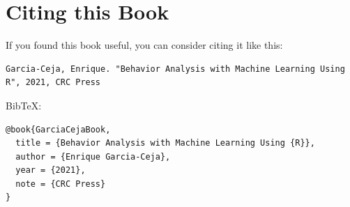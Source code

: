 \documentclass[
  11pt,
]{krantz}
\begin{document}
\hypertarget{citing-this-book}{%
\chapter*{Citing this Book}\label{citing-this-book}}


If you found this book useful, you can consider citing it like this:

\begin{verbatim}
Garcia-Ceja, Enrique. "Behavior Analysis with Machine Learning Using R", 2021, CRC Press
\end{verbatim}

BibTeX:

\begin{verbatim}
@book{GarciaCejaBook,
  title = {Behavior Analysis with Machine Learning Using {R}},
  author = {Enrique Garcia-Ceja},
  year = {2021},
  note = {CRC Press}
}
\end{verbatim}

  

\backmatter
{}
\printindex
\end{document}
